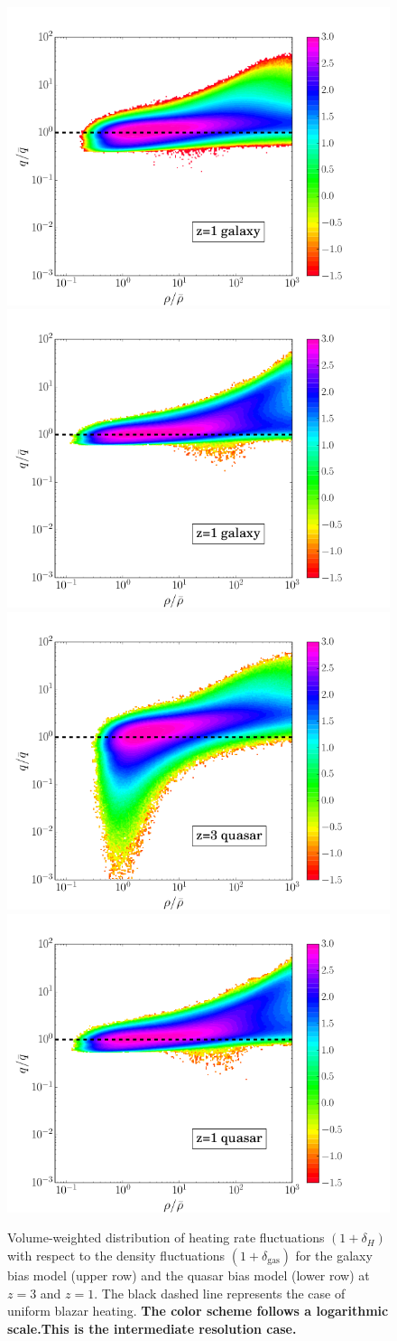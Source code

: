 \documentclass[numberedappendix]{emulateapj}
\newcommand\ALc[1]{{\color{red} \bf #1}} %
\begin{document}
\begin{figure}[h]
\centering
\includegraphics[width = .45\textwidth ]{delta_deltah_z3_gal2_ok.png}
\includegraphics[width = .45\textwidth ]{delta_deltah_z1_gal2_ok.png}\\
\includegraphics[width = .45\textwidth ]{delta_deltah_z3_qso4_512b.png}
\includegraphics[width = .45\textwidth ]{delta_deltah_z1_qso4_512b.png}
\caption{Volume-weighted distribution of heating rate fluctuations $(1+\delta_H)$ with respect to the density fluctuations $(1+\delta_{\mathrm{gas}})$ for the galaxy bias model (upper row) and the quasar bias model (lower row) at $z=3$ and $z=1$. The black dashed line represents the case of uniform blazar heating. \ALc{The color scheme follows a logarithmic scale.This is the intermediate resolution case.}}
\label{fig:deltas}
\end{figure}
\end{document}
